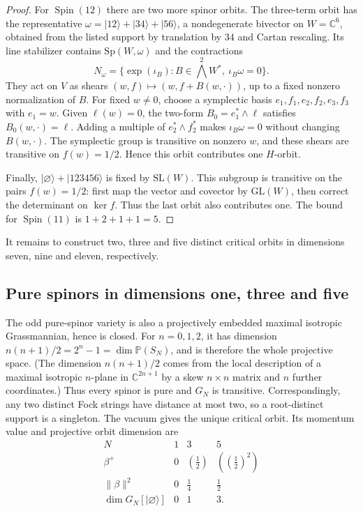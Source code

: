 \documentclass{article}
\theoremstyle{definition}
\theoremstyle{remark}
\newcommand{\C}{\mathbb C}
\newcommand{\PP}{\mathbb P}
\newcommand{\Spin}{\operatorname{Spin}}
\newcommand{\ket}[1]{\lvert #1\rangle}
\newcommand{\norm}[1]{\lVert #1\rVert}
\begin{document}
\begin{proof}
For $\Spin(12)$ there are two more spinor orbits. The three-term orbit
has the representative
$\omega=\ket{12}+\ket{34}+\ket{56}$, a nondegenerate bivector on
$W=\C^6$, obtained from the listed support by translation by $34$ and Cartan
rescaling. Its line stabilizer contains
$\mathrm{Sp}(W,\omega)$ and the contractions
\begin{equation}
 N_\omega=\{\exp(\iota_B):B\in\bigwedge^2W^*,\
                         \iota_B\omega=0\}.
\end{equation}
They act on $V$ as shears $(w,f)\mapsto(w,f+B(w,\cdot))$,
up to a fixed nonzero normalization of $B$.
For fixed $w\ne0$, choose a symplectic basis
$e_1,f_1,e_2,f_2,e_3,f_3$ with $e_1=w$.
Given $\ell(w)=0$, the two-form $B_0=e_1^*\wedge\ell$ satisfies
$B_0(w,\cdot)=\ell$. Adding a multiple of $e_2^*\wedge f_2^*$
makes $\iota_B\omega=0$ without changing $B(w,\cdot)$.
The symplectic group is transitive on nonzero $w$, and these shears are
transitive on $f(w)=1/2$. Hence this orbit contributes one $H$-orbit.

Finally, $\ket\varnothing+\ket{123456}$ is fixed by
$\mathrm{SL}(W)$. This subgroup is transitive on the pairs
$f(w)=1/2$: first map the vector and covector by $\mathrm{GL}(W)$,
then correct the determinant on $\ker f$. Thus the last orbit also
contributes one. The bound for $\Spin(11)$ is $1+2+1+1=5$.
\end{proof}

It remains to construct two, three and five distinct critical orbits in
dimensions seven, nine and eleven, respectively.


\subsection{Pure spinors in dimensions one, three and five}
\label{sec:odd-pure-cases}

The odd pure-spinor variety is also a projectively embedded maximal
isotropic Grassmannian, hence is closed. For $n=0,1,2$, it has dimension
$n(n+1)/2=2^n-1=\dim\PP(S_N)$, and is therefore the whole projective
space. 
(The dimension $n(n+1)/2$ comes from the local description of a maximal
isotropic $n$-plane in $\C^{2n+1}$ by a skew $n\times n$ matrix and $n$
further coordinates.) Thus every spinor is pure and $G_N$ is transitive.
Correspondingly, any two distinct Fock strings have distance at most two,
so a root-distinct support is a singleton.
The vacuum gives the unique critical orbit.  Its momentum value and projective orbit
dimension are
\[
\begin{array}{c|ccc}
N&1&3&5\\ \hline
\beta^+&0&(\frac12)&((\frac12)^2)\\
\norm\beta^2&0&\frac14&\frac12\\
\dim G_N[\ket\varnothing]&0&1&3.
\end{array}
\]
\end{document}
